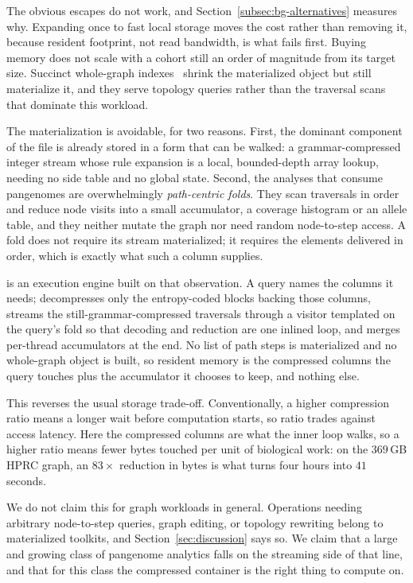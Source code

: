 The obvious escapes do not work, and Section~\ref{subsec:bg-alternatives} measures
why. Expanding once to fast local storage moves the cost rather than removing it,
because resident footprint, not read bandwidth, is what fails first. Buying memory
does not scale with a cohort still an order of magnitude from its target size.
Succinct whole-graph indexes~\cite{siren2022gbz} shrink the materialized object but
still materialize it, and they serve topology queries rather than the traversal
scans that dominate this workload.

The materialization is avoidable, for two reasons. First, the dominant component
of the file is already stored in a form that can be walked: a grammar-compressed
integer stream whose rule expansion is a local, bounded-depth array lookup, needing
no side table and no global state. Second, the analyses that consume pangenomes are
overwhelmingly \emph{path-centric folds}. They scan traversals in order and reduce
node visits into a small accumulator, a coverage histogram or an allele table, and
they neither mutate the graph nor need random node-to-step access. A fold does not
require its stream materialized; it requires the elements delivered in order, which
is exactly what such a column supplies.

\sys is an execution engine built on that observation. A query names the columns it
needs; \sys decompresses only the entropy-coded blocks backing those columns,
streams the still-grammar-compressed traversals through a visitor templated on the
query's fold so that decoding and reduction are one inlined loop, and merges
per-thread accumulators at the end. No list of path steps is materialized and no
whole-graph object is built, so resident memory is the compressed columns the query
touches plus the accumulator it chooses to keep, and nothing else.

This reverses the usual storage trade-off. Conventionally, a higher compression
ratio means a longer wait before computation starts, so ratio trades against access
latency. Here the compressed columns are what the inner loop walks, so a higher
ratio means fewer bytes touched per unit of biological work: on the $369$\,GB HPRC
graph, an $83\times$ reduction in bytes is what turns four hours into $41$ seconds.

We do not claim this for graph workloads in general. Operations needing arbitrary
node-to-step queries, graph editing, or topology rewriting belong to materialized
toolkits, and Section~\ref{sec:discussion} says so. We claim that a large and
growing class of pangenome analytics falls on the streaming side of that line, and
that for this class the compressed container is the right thing to compute on.

